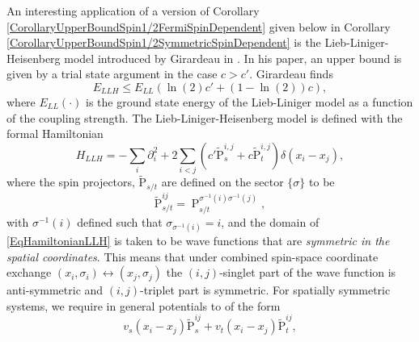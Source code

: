 An interesting application of a version of Corollary \ref{CorollaryUpperBoundSpin1/2FermiSpinDependent} given below in Corollary \ref{CorollaryUpperBoundSpin1/2SymmetricSpinDependent} is the Lieb-Liniger-Heisenberg model introduced by Girardeau in \cite{girardeau2006ground}. In his paper, an upper bound is given by a trial state argument in the case $ c>c' $. Girardeau finds \begin{equation}\label{EqGirardeauUpperBoundLLH}
E_{LLH}\leq E_{LL}(\ln(2)c'+(1-\ln(2))c),
\end{equation}
where $ E_{LL}(\cdot) $ is the ground state energy of the Lieb-Liniger model as a function of the coupling strength. The Lieb-Liniger-Heisenberg model is defined with the formal Hamiltonian\begin{equation}\label{EqHamiltonianLLH}
H_{LLH}=-\sum_i \partial_i^2 +2\sum_{i<j} \left(c'\operatorname{\tilde{P}}^{i,j}_s+c\operatorname{\tilde{P}}^{i,j}_t\right)\delta(x_i-x_j),
\end{equation}
where the spin projectors, $\operatorname{\tilde{P}}_{s/t}$ are defined on the sector $ \{\sigma\} $ to be  $$\operatorname{\tilde{P}}^{ij}_{s/t}=\operatorname{P}^{\sigma^{-1}(i)\sigma^{-1}(j)}_{s/t},$$
with $ \sigma^{-1}(i) $ defined such that $ \sigma_{\sigma^{-1}(i)}=i $, and the domain of \eqref{EqHamiltonianLLH} is taken to be wave functions that are \emph{symmetric in the spatial coordinates}. This means that under combined spin-space coordinate exchange $ (x_i,\sigma_i)\leftrightarrow(x_j,\sigma_j) $ the $ (i,j) $-singlet part of the wave function is anti-symmetric and $ (i,j) $-triplet part is symmetric.
For spatially symmetric systems, we require in general potentials to of the form \begin{equation}\label{EqSpatialSymmetricPotentials}
v_s(x_i-x_j)\operatorname{\tilde{P}}^{ij}_s+v_t(x_i-x_j)\operatorname{\tilde{P}}^{ij}_t,
\end{equation} 
